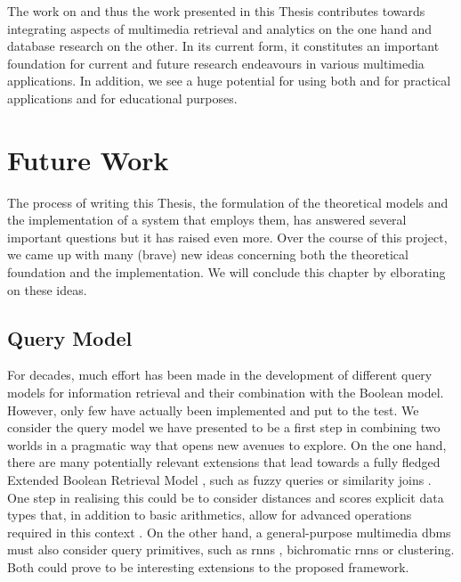 The work on \cottontail{} and thus the work presented in this Thesis contributes towards integrating aspects of multimedia retrieval and analytics on the one hand and database research on the other. In its current form, it constitutes an important foundation for current and future research endeavours in various multimedia applications. In addition, we see a huge potential for using both \vitrivr{} and \cottontail{} for practical applications and for educational purposes.

\section{Future Work}

The process of writing this Thesis, the formulation of the theoretical models and the implementation of a system that employs them, has answered several important questions but it has raised even more. Over the course of this project, we came up with many (brave) new ideas concerning both the theoretical foundation and the implementation. We will conclude this chapter by elborating on these ideas.

\subsection{Query Model}

For decades, much effort has been made in the development of different query models for information retrieval and their combination with the Boolean model. However, only few have actually been implemented and put to the test. We consider the query model we have presented to be a first step in combining two worlds in a pragmatic way that opens new avenues to explore. On the one hand, there are many potentially relevant extensions that lead towards a fully fledged Extended Boolean Retrieval Model \cite{Salton:1983Extended}, such as fuzzy queries \cite{Umano:1983Retrieval,Bohm:2001Fast} or similarity joins \cite{Yao:2010K}. One step in realising this could be to consider distances and scores explicit data types that, in addition to basic arithmetics, allow for advanced operations required in this context \cite{Silva:2010SimDB}. On the other hand, a general-purpose multimedia \acrshort{dbms} must also consider query primitives, such as \acrshort{rnns} \cite{Korn:2000Influence}, bichromatic \acrshort{rnns} \cite{Stanoi:2001Discovery} or clustering. Both could prove to be interesting extensions to the proposed framework.

